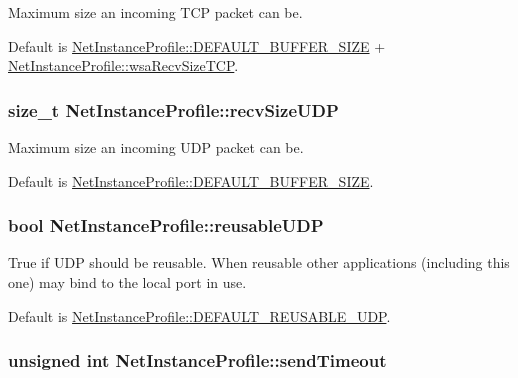 Maximum size an incoming TCP packet can be. 

Default is \hyperlink{class_net_instance_profile_a285d88534b9936cc603e778aa70d8ec3}{NetInstanceProfile::DEFAULT\_\-BUFFER\_\-SIZE} + \hyperlink{class_net_instance_profile_ad83ca6291444ecb7e1138f336952afc7}{NetInstanceProfile::wsaRecvSizeTCP}. \hypertarget{class_net_instance_profile_ae24b078e006a395092d9256ab5947e95}{
\subsubsection[{recvSizeUDP}]{\setlength{\rightskip}{0pt plus 5cm}size\_\-t {\bf NetInstanceProfile::recvSizeUDP}}}
\label{class_net_instance_profile_ae24b078e006a395092d9256ab5947e95}


Maximum size an incoming UDP packet can be. 

Default is \hyperlink{class_net_instance_profile_a285d88534b9936cc603e778aa70d8ec3}{NetInstanceProfile::DEFAULT\_\-BUFFER\_\-SIZE}. \hypertarget{class_net_instance_profile_ad73bd8106b0993d4f8c89f2293c7a4e2}{
\subsubsection[{reusableUDP}]{\setlength{\rightskip}{0pt plus 5cm}bool {\bf NetInstanceProfile::reusableUDP}}}
\label{class_net_instance_profile_ad73bd8106b0993d4f8c89f2293c7a4e2}


True if UDP should be reusable. When reusable other applications (including this one) may bind to the local port in use. 

Default is \hyperlink{class_net_instance_profile_a899fa95f6ada0deb60f43dae6935976f}{NetInstanceProfile::DEFAULT\_\-REUSABLE\_\-UDP}. \hypertarget{class_net_instance_profile_a6cc36534bcb31e4411e2698e55908c18}{
\subsubsection[{sendTimeout}]{\setlength{\rightskip}{0pt plus 5cm}unsigned int {\bf NetInstanceProfile::sendTimeout}}}
\label{class_net_instance_profile_a6cc36534bcb31e4411e2698e55908c18}



